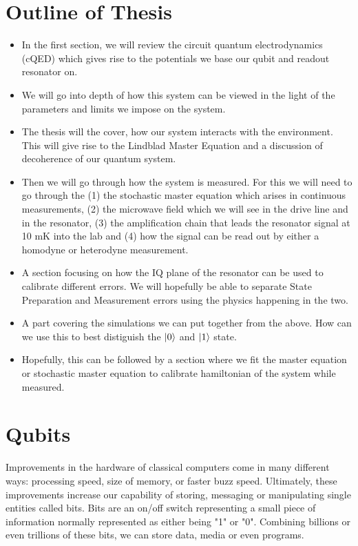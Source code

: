 \section{Outline of Thesis}
\begin{itemize}
    \item In the first section, we will review the circuit quantum electrodynamics (cQED) which gives rise to the potentials we base our qubit and readout resonator on.
    \item We will go into depth of how this system can be viewed in the light of the parameters and limits we impose on the system.
    \item The thesis will the cover, how our system interacts with the environment. This will give rise to the Lindblad Master Equation and a discussion of decoherence of our quantum system. 
    \item Then we will go through how the system is measured. For this we will need to go through the (1) the stochastic master equation which arises in continuous measurements, (2) the microwave field which we will see in the drive line and in the resonator, (3) the amplification chain that leads the resonator signal at 10 mK into the lab and (4) how the signal can be read out by either a homodyne or heterodyne measurement.
    \item A section focusing on how the IQ plane of the resonator can be used to calibrate different errors. We will hopefully be able to separate State Preparation and Measurement errors using the physics happening in the two.
    \item A part covering the simulations we can put together from the above. How can we use this to best distiguish the $\ket{0}$ and $\ket{1}$ state. 
    \item Hopefully, this can be followed by a section where we fit the master equation or stochastic master equation to calibrate hamiltonian of the system while measured.
\end{itemize}

\section{Qubits}
Improvements in the hardware of classical computers come in many different ways: processing speed, size of memory, or faster buzz speed. Ultimately, these improvements increase our capability of storing, messaging or manipulating single entities called bits. Bits are an on/off switch representing a small piece of information normally represented as either being "1" or "0". Combining billions or even trillions of these bits, we can store data, media or even programs. \\ 

